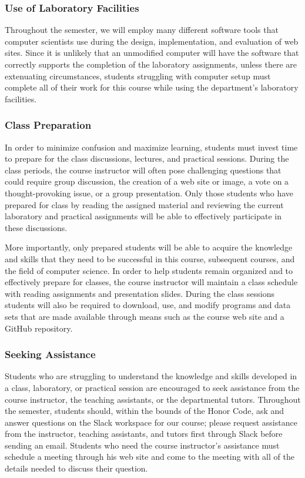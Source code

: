 \documentclass[11pt]{article}
\newcommand{\instructorpronoun}[1]{his}
\begin{document}
\subsubsection*{Use of Laboratory Facilities}

Throughout the semester, we will employ many different software tools that
computer scientists use during the design, implementation, and evaluation of web
sites. Since it is unlikely that an unmodified computer will have the software
that correctly supports the completion of the laboratory assignments, unless
there are extenuating circumstances, students struggling with computer setup
must complete all of their work for this course while using the department's
laboratory facilities.

\subsubsection*{Class Preparation}

In order to minimize confusion and maximize learning, students must invest time
to prepare for the class discussions, lectures, and practical sessions. During
the class periods, the course instructor will often pose challenging questions
that could require group discussion, the creation of a web site or image, a vote
on a thought-provoking issue, or a group presentation. Only those students who
have prepared for class by reading the assigned material and reviewing the
current laboratory and practical assignments will be able to effectively
participate in these discussions.

More importantly, only prepared students will be able to acquire the knowledge
and skills that they need to be successful in this course, subsequent courses,
and the field of computer science. In order to help students remain organized
and to effectively prepare for classes, the course instructor will maintain a
class schedule with reading assignments and presentation slides. During the
class sessions students will also be required to download, use, and modify
programs and data sets that are made available through means such as the course
web site and a GitHub repository.

\subsubsection*{Seeking Assistance}

Students who are struggling to understand the knowledge and skills developed in
a class, laboratory, or practical session are encouraged to seek assistance from
the course instructor, the teaching assistants, or the departmental tutors.
Throughout the semester, students should, within the bounds of the Honor Code,
ask and answer questions on the Slack workspace for our course; please request
assistance from the instructor, teaching assistants, and tutors first through
Slack before sending an email. Students who need the course instructor's
assistance must schedule a meeting through \instructorpronoun{} web site and
come to the meeting with all of the details needed to discuss their question.
\end{document}
